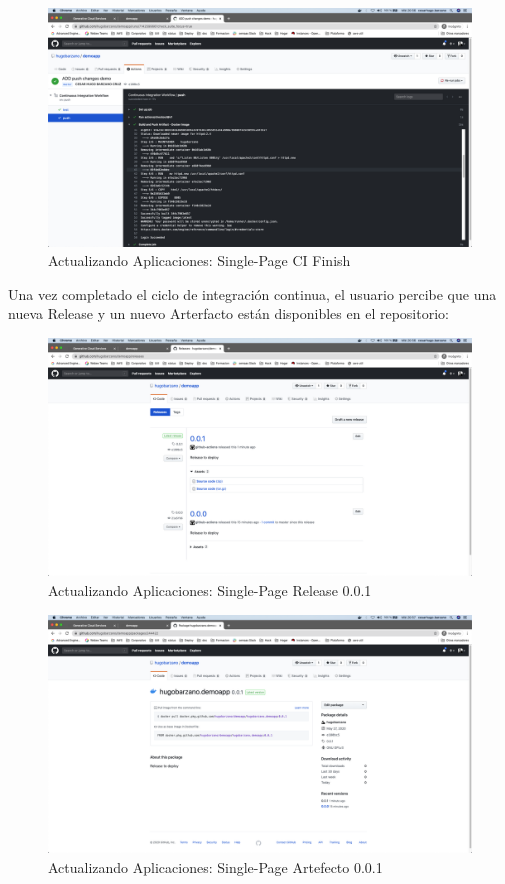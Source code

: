 \documentclass[a4paper,11pt]{book}
\begin{document}
  \begin{figure}[H]
\centering
\includegraphics[scale=0.2]{imagenes/casouso/2_7.png}
\caption{ Actualizando Aplicaciones: Single-Page CI Finish  }
\end{figure}

 Una vez completado el ciclo de integración continua, el usuario percibe que una nueva Release y un nuevo Arterfacto están disponibles en el repositorio:
 
   \begin{figure}[H]
\centering
\includegraphics[scale=0.2]{imagenes/casouso/2_8.png}
\caption{  Actualizando Aplicaciones: Single-Page Release 0.0.1  }
\end{figure}

  \begin{figure}[H]
\centering
\includegraphics[scale=0.2]{imagenes/casouso/2_9.png}
\caption{  Actualizando Aplicaciones: Single-Page Artefecto 0.0.1 }
\end{figure}
 
\end{document}
